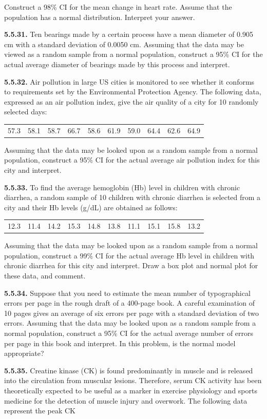 Construct a 98\% CI for the mean change in heart rate. Assume that the population has a normal distribution. Interpret your answer.

\textbf{5.5.31.} Ten bearings made by a certain process have a mean diameter of 0.905 cm with a standard deviation of 0.0050 cm. Assuming that the data may be viewed as a random sample from a normal population, construct a 95\% CI for the actual average diameter of bearings made by this process and interpret.

\textbf{5.5.32.} Air pollution in large US cities is monitored to see whether it conforms to requirements set by the Environmental Protection Agency. The following data, expressed as an air pollution index, give the air quality of a city for 10 randomly selected days:
\begin{center}
\begin{tabular}{cccccccccc}
57.3 & 58.1 & 58.7 & 66.7 & 58.6 & 61.9 & 59.0 & 64.4 & 62.6 & 64.9
\end{tabular}
\end{center}

Assuming that the data may be looked upon as a random sample from a normal population, construct a 95\% CI for the actual average air pollution index for this city and interpret.

\textbf{5.5.33.} To find the average hemoglobin (Hb) level in children with chronic diarrhea, a random sample of 10 children with chronic diarrhea is selected from a city and their Hb levels (g/dL) are obtained as follows:
\begin{center}
\begin{tabular}{cccccccccc}
12.3 & 11.4 & 14.2 & 15.3 & 14.8 & 13.8 & 11.1 & 15.1 & 15.8 & 13.2
\end{tabular}
\end{center}

Assuming that the data may be looked upon as a random sample from a normal population, construct a 99\% CI for the actual average Hb level in children with chronic diarrhea for this city and interpret. Draw a box plot and normal plot for these data, and comment.

\textbf{5.5.34.} Suppose that you need to estimate the mean number of typographical errors per page in the rough draft of a 400-page book. A careful examination of 10 pages gives an average of six errors per page with a standard deviation of two errors. Assuming that the data may be looked upon as a random sample from a normal population, construct a 95\% CI for the actual average number of errors per page in this book and interpret. In this problem, is the normal model appropriate?

\textbf{5.5.35.} Creatine kinase (CK) is found predominantly in muscle and is released into the circulation from muscular lesions. Therefore, serum CK activity has been theoretically expected to be useful as a marker in exercise physiology and sports medicine for the detection of muscle injury and overwork. The following data represent the peak CK
